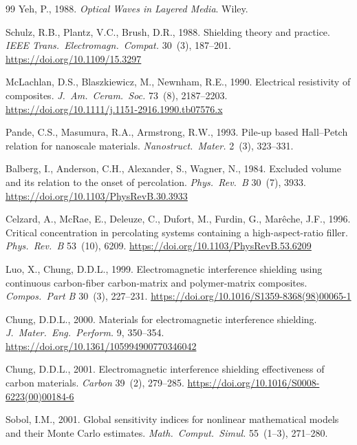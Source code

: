 \documentclass[review,3p,authoryear]{elsarticle}
\begin{document}
\begin{thebibliography}{99}
Yeh, P., 1988.
\textit{Optical Waves in Layered Media}. Wiley.

Schulz, R.B., Plantz, V.C., Brush, D.R., 1988.
Shielding theory and practice.
\textit{IEEE Trans.\ Electromagn.\ Compat.} 30~(3), 187--201.
\url{https://doi.org/10.1109/15.3297}

McLachlan, D.S., Blaszkiewicz, M., Newnham, R.E., 1990.
Electrical resistivity of composites.
\textit{J.\ Am.\ Ceram.\ Soc.} 73~(8), 2187--2203.
\url{https://doi.org/10.1111/j.1151-2916.1990.tb07576.x}

Pande, C.S., Masumura, R.A., Armstrong, R.W., 1993.
Pile-up based Hall--Petch relation for nanoscale materials.
\textit{Nanostruct.\ Mater.} 2~(3), 323--331.

Balberg, I., Anderson, C.H., Alexander, S., Wagner, N., 1984.
Excluded volume and its relation to the onset of percolation.
\textit{Phys.\ Rev.\ B} 30~(7), 3933.
\url{https://doi.org/10.1103/PhysRevB.30.3933}

Celzard, A., McRae, E., Deleuze, C., Dufort, M., Furdin, G., Mar\^{e}che, J.F., 1996.
Critical concentration in percolating systems containing a high-aspect-ratio filler.
\textit{Phys.\ Rev.\ B} 53~(10), 6209.
\url{https://doi.org/10.1103/PhysRevB.53.6209}

Luo, X., Chung, D.D.L., 1999.
Electromagnetic interference shielding using continuous carbon-fiber carbon-matrix and polymer-matrix composites.
\textit{Compos.\ Part B} 30~(3), 227--231.
\url{https://doi.org/10.1016/S1359-8368(98)00065-1}

Chung, D.D.L., 2000.
Materials for electromagnetic interference shielding.
\textit{J.\ Mater.\ Eng.\ Perform.} 9, 350--354.
\url{https://doi.org/10.1361/105994900770346042}

Chung, D.D.L., 2001.
Electromagnetic interference shielding effectiveness of carbon materials.
\textit{Carbon} 39~(2), 279--285.
\url{https://doi.org/10.1016/S0008-6223(00)00184-6}

Sobol, I.M., 2001.
Global sensitivity indices for nonlinear mathematical models and their Monte Carlo estimates.
\textit{Math.\ Comput.\ Simul.} 55~(1--3), 271--280.


\end{thebibliography}
\end{document}
